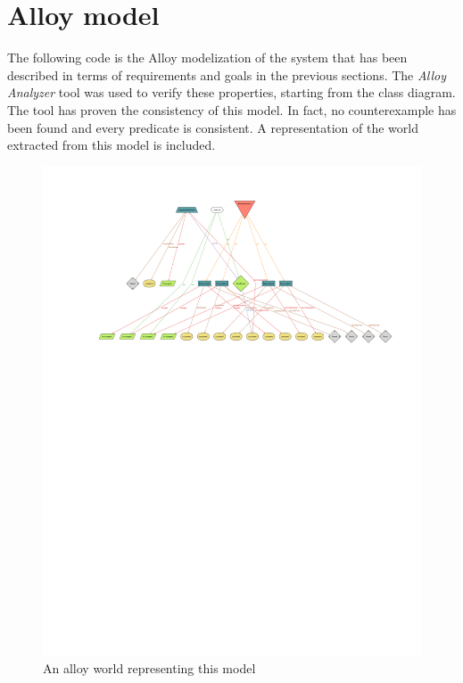 \section{Alloy model}
The following code is the Alloy modelization of the system that has been described in terms of requirements and goals in the previous sections. The \emph{Alloy Analyzer} tool was used to verify these properties, starting from the class diagram. The tool has proven the consistency of this model. In fact, no counterexample has been found and every predicate is consistent. A representation of the world extracted from this model is included.

\begin{figure}
\centering
\includegraphics[width=\textheight, angle=90]{tex-images/alloy-world}
\caption{An alloy world representing this model}
\end{figure}

